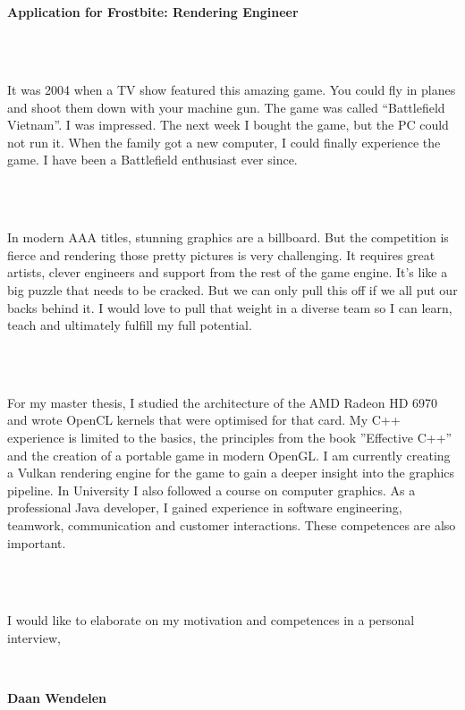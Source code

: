 \documentclass[11pt,a4paper,arial]{moderncv}        %
\begin{document}
\date{2016-10-18}

\makelettertitle

~\\
~

\textbf {Application for Frostbite: Rendering Engineer}

~\\
~

It was 2004 when a TV show featured this amazing game. You could fly in planes and shoot them down with your machine gun. The game was
called ``Battlefield Vietnam''. I was impressed. The next week I bought the game, but the PC could not run it.
When the family got a new computer, I could finally experience the game. I have been a Battlefield enthusiast ever since.

~\\
~

In modern AAA titles, stunning graphics are a billboard. But the competition is fierce and rendering those pretty pictures
is very challenging. It requires great artists, clever engineers and support from the rest of the game engine. It's like a big puzzle
that needs to be cracked. But we can only pull this off if we all put our backs behind it. I would love to pull that weight in a diverse team so
I can learn, teach and ultimately fulfill my full potential.

~\\
~

For my master thesis, I studied the architecture of the AMD Radeon HD 6970 and 
wrote OpenCL kernels that were optimised for that card. My C++ experience is limited to the basics, the principles from the book ''Effective C++'' and the
creation of a portable game in modern OpenGL. I am currently creating a Vulkan rendering engine for the game to gain a deeper insight into the graphics pipeline.
In University I also followed a course on computer graphics.
As a professional Java developer, I gained experience in software engineering, teamwork, communication and customer interactions. These competences are also important.

~\\
~

I would like to elaborate on my motivation and competences in a personal interview,


~

\textbf {Daan Wendelen}

\makeletterclosing
\end{document}

